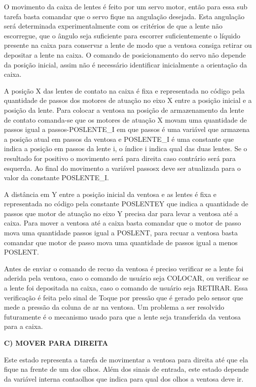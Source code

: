 O movimento da caixa de lentes é feito por um servo motor, então para essa sub tarefa basta comandar que o servo fique na angulação desejada. Esta angulação será determinada experimentalmente com os critérios de que a lente não escorregue, que o ângulo seja suficiente para escorrer suficientemente o líquido presente na caixa para conservar a lente de modo que a ventosa consiga retirar ou depositar a lente na caixa. O comando de posicionamento do servo não depende da posição inicial, assim não é necessário identificar inicialmente a orientação da caixa. 

A posição X das lentes de contato na caixa é fixa e representada no código pela quantidade de passos dos motores de atuação no eixo X entre a posição inicial e a posição da lente. Para colocar a ventosa na posição de armazenamento da lente de contato comanda-se que os motores de atuação X movam uma quantidade de passos igual a passos-POSLENTE\_I em que passos é uma variável que armazena a posição atual em passos da ventosa e POSLENTE\_I é uma constante que indica a posição em passos da lente i, o índice i indica qual das duas lentes. Se o resultado for positivo o movimento será para direita caso contrário será para esquerda.  Ao final do movimento a variável passosx deve ser atualizada para o valor da constante POSLENTE\_I.

A distância em Y entre a posição inicial da ventosa e as lentes é fixa e representada no código pela constante POSLENTEY que indica a quantidade de passos que motor de atuação no eixo Y precisa dar para levar a ventosa até a caixa.   Para mover a ventosa até a caixa basta comandar que o motor de passo mova uma quantidade passos igual a POSLENT, para recuar a ventosa basta comandar que motor de passo mova uma quantidade de passos igual a menos POSLENT. 

Antes de enviar o comando de recuo da ventosa é preciso verificar se a lente foi aderida pela ventosa, caso o comando de usuário seja COLOCAR, ou verificar se a lente foi depositada na caixa, caso o comando de usuário seja RETIRAR. Essa verificação é feita pelo sinal de Toque por pressão que é gerado pelo sensor que mede a pressão da coluna de ar na ventosa. Um problema a ser resolvido futuramente é o mecanismo usado para que a lente seja transferida da ventosa para a caixa.
 

\textbf{C)	MOVER PARA DIREITA}

Este estado representa a tarefa de movimentar a ventosa para direita até que ela fique na frente de um dos olhos. Além dos sinais de entrada, este estado depende da variável interna contaolhos que indica para qual dos olhos a ventosa deve ir. 

